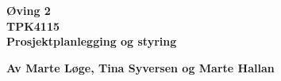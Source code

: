 \begin{titlepage}
\begin{center}

{\Huge \bf Øving 2} \\[1.0cm]
{\Huge \bf TPK4115} \\[1.0cm]
{\Large \bf Prosjektplanlegging og styring} \\[1.0cm]
\vspace{1cm}

{\bf Av Marte Løge, Tina Syversen og Marte Hallan}


\end{center}
\end{titlepage}